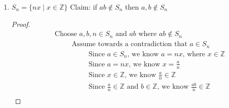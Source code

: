 \documentclass{article}
\begin{document}
\begin{enumerate}
\begin{enumerate}
\begin{proof}
\begin{align}
                &\quad \hspace{2cm} \text{Since } z \text{ is rational, we know } z = \frac{p_2}{q_2} \text{, where } p_2,q_2 \in \mathbb{Z} \\
                &\quad \hspace{2cm} \text{We can rewrite } x + y = z \text{ as } x + \frac{p_1}{q_1} = \frac{p_2}{q_2} \\
                &\quad \hspace{2cm} \text{Since } x + \frac{p_1}{q_1} = \frac{p_2}{q_2} \text{, we know } x = \frac{p_2}{q_2} - \frac{p_1}{q_1} \\
                &\quad \hspace{2cm} \text{Since } x = \frac{p_2q_1 - p_1q_2}{q_1q_2} \text{, we know } x = \frac{p_1q_2 - p_2q_1}{q_1q_2} \\
                &\quad \hspace{2cm} \text{Since } x = \frac{p_1q_2 - p_2q_1}{q_1q_2} \text{, we know } x \text{ is rational} \\
                &\quad \hspace{1cm} \text{This is a contradiction to our earlier claim, so } z \text{ must be irrational}
            \end{align}
        \end{proof}
        \item $S_n = \{nx \mid x \in \mathbb{Z}\}$
        Claim: if $ab \notin S_n$ then $a,b \notin S_n$
        \begin{proof}
            \begin{align}
                &\quad \text{Choose } a,b,n \in S_n \text{ and } ab \text{ where } ab \notin S_n \\
                &\quad \hspace{1cm} \text{Assume towards a contradiction that } a \in S_n \\
                &\quad \hspace{2cm} \text{Since } a \in S_n \text{, we know } a = nx \text{, where } x \in \mathbb{Z} \\
                &\quad \hspace{2cm} \text{Since } a = nx \text{, we know } x = \frac{a}{n} \\
                &\quad \hspace{2cm} \text{Since } x \in \mathbb{Z} \text{, we know } \frac{a}{n} \in \mathbb{Z} \\
                &\quad \hspace{2cm} \text{Since } \frac{a}{n} \in \mathbb{Z} \text{ and } b \in \mathbb{Z} \text{, we know } \frac{ab}{n} \in \mathbb{Z} \\

\end{align}
\end{proof}
\end{enumerate}
\end{enumerate}
\end{document}
